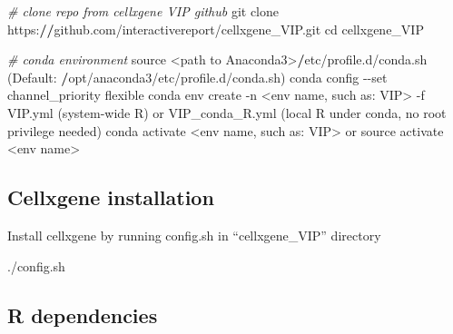 \documentclass[
]{book}
\newenvironment{Shaded}{\begin{snugshade}}{\end{snugshade}}
\newcommand{\CommentTok}[1]{\textcolor[rgb]{0.56,0.35,0.01}{\textit{#1}}}
\newcommand{\ErrorTok}[1]{\textcolor[rgb]{0.64,0.00,0.00}{\textbf{#1}}}
\newcommand{\FunctionTok}[1]{\textcolor[rgb]{0.00,0.00,0.00}{#1}}
\newcommand{\NormalTok}[1]{#1}
\newcommand{\SpecialCharTok}[1]{\textcolor[rgb]{0.00,0.00,0.00}{#1}}
\begin{document}
\begin{Shaded}
\begin{Highlighting}[]
\CommentTok{\# clone repo from cellxgene VIP github}
\NormalTok{git clone https}\SpecialCharTok{:}\ErrorTok{//}\NormalTok{github.com}\SpecialCharTok{/}\NormalTok{interactivereport}\SpecialCharTok{/}\NormalTok{cellxgene\_VIP.git}
\NormalTok{cd cellxgene\_VIP}

\CommentTok{\# conda environment}
\NormalTok{source }\SpecialCharTok{\textless{}}\NormalTok{path to Anaconda3}\SpecialCharTok{\textgreater{}}\ErrorTok{/}\NormalTok{etc}\SpecialCharTok{/}\NormalTok{profile.d}\SpecialCharTok{/}\FunctionTok{conda.sh}\NormalTok{ (Default}\SpecialCharTok{:} \ErrorTok{/}\NormalTok{opt}\SpecialCharTok{/}\NormalTok{anaconda3}\SpecialCharTok{/}\NormalTok{etc}\SpecialCharTok{/}\NormalTok{profile.d}\SpecialCharTok{/}\NormalTok{conda.sh)}
\NormalTok{conda config }\SpecialCharTok{{-}{-}}\NormalTok{set channel\_priority flexible}
\NormalTok{conda env create }\SpecialCharTok{{-}}\NormalTok{n }\SpecialCharTok{\textless{}}\NormalTok{env name, such as}\SpecialCharTok{:}\NormalTok{ VIP}\SpecialCharTok{\textgreater{}} \SpecialCharTok{{-}}\NormalTok{f }\FunctionTok{VIP.yml}\NormalTok{ (system}\SpecialCharTok{{-}}\NormalTok{wide R) or }\FunctionTok{VIP\_conda\_R.yml}\NormalTok{ (local R under conda, no root privilege needed)}
\NormalTok{conda activate }\SpecialCharTok{\textless{}}\NormalTok{env name, such as}\SpecialCharTok{:}\NormalTok{ VIP}\SpecialCharTok{\textgreater{}}
\NormalTok{or}
\NormalTok{source activate }\SpecialCharTok{\textless{}}\NormalTok{env name}\SpecialCharTok{\textgreater{}}
\end{Highlighting}
\end{Shaded}

\hypertarget{cellxgene-installation}{%
\subsection{Cellxgene installation}\label{cellxgene-installation}}

Install cellxgene by running config.sh in ``cellxgene\_VIP'' directory

\begin{Shaded}
\begin{Highlighting}[]
\NormalTok{.}\SpecialCharTok{/}\NormalTok{config.sh}
\end{Highlighting}
\end{Shaded}

\hypertarget{r-dependencies}{%
\subsection{R dependencies}\label{r-dependencies}}
\end{document}
